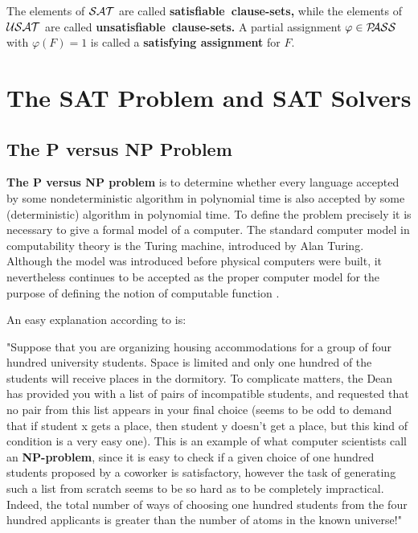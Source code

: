 \documentclass[12pt]{book}
\begin{document}
The elements of $\mathcal{SAT}$ are called \mbox{\textbf{satisfiable clause-sets,}}
while the elements of  $\mathcal{USAT}$ are called \mbox{\textbf{unsatisfiable clause-sets.}}
A partial assignment $\varphi \in \mathcal{P\hspace{-0.32em}ASS}$ with $\varphi(F) = 1$ is called a \textbf{satisfying assignment} for $F$.


\chapter{The SAT Problem and SAT Solvers}
\label{cha:SAT Problem and SAT Solvers}
\section{The P versus NP Problem}
\label{sec:The P versus NP Problem}
\begin{defi}\label{def:np} \textbf{The P versus NP problem} is to determine whether every language accepted by some nondeterministic algorithm in polynomial time is also accepted by some
(deterministic) algorithm in polynomial time. To define the problem precisely it is necessary to give a formal model of a computer.
The standard computer model in computability theory is the Turing machine, introduced by Alan Turing. Although the model was introduced before physical computers were built, it
nevertheless continues to be accepted as the proper computer model for the purpose of defining the notion of computable function \cite{h4}.
\end{defi} 
An easy explanation according to \cite{h3} is:

"Suppose that you are organizing housing accommodations for a group of four hundred university students. Space is limited and only one hundred of the students will receive places in the dormitory. To complicate matters, the Dean has
provided you with a list of pairs of incompatible students, and requested that no pair from this list appears in your final choice (seems to be odd to demand that if student x gets a place, then
student y doesn’t get a place, but this kind of condition is a very easy one). This is an example of what computer scientists call an \textbf{NP-problem}, since it is easy to check if a given choice of
one hundred students proposed by a coworker is satisfactory, however the task of generating such a list from scratch seems to be so hard as to be completely impractical. Indeed, the total number of ways 
of choosing one hundred students from the four hundred applicants is greater than the number of atoms in the known universe!"
\end{document}
